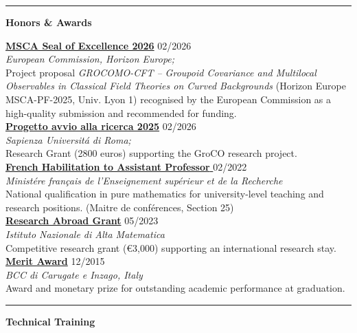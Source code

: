\documentclass[a4paper]{article}
\newcommand{\block}[1]{\hrule \vspace{0.2cm} \textbf{\Large #1} \vspace{0.2cm}}
\newcommand{\voice}[5]{\href{#4}{\textbf{#1}} \hfill #2 \\ \textit{#3} \\ {\small #5} \vspace{0.2cm} \\}
\begin{document}
\clearpage

\block{Honors \& Awards}

\voice{MSCA Seal of Excellence 2026}
        {02/2026}
        {European Commission, Horizon Europe;}
        {https://www.dropbox.com/scl/fi/zr05hlqz8rpq4d9j51b7q/2602-MSCA-SealofExcellence.pdf?rlkey=ovu5ad8hmdjh9nkaqy8rmq3lb&st=wbag5jwb&dl=0}       
        {Project proposal \emph{GROCOMO-CFT – Groupoid Covariance and Multilocal Observables in Classical Field Theories on Curved Backgrounds} (Horizon Europe MSCA-PF-2025, Univ. Lyon 1) recognised by the European Commission as a high-quality submission and recommended for funding.}
\voice{Progetto avvio alla ricerca 2025}
        {02/2026}
        {Sapienza Universit\'a di Roma;}
        {https://www.dropbox.com/scl/fi/sgragjrgzdtfesdmhm4bv/2602-AvvioRicerca-Grant.pdf?rlkey=6iplpssiva66zkdw7qna4wl0c&st=x8jty2x7&dl=0}       
        {Research Grant (2800 euros) supporting the GroCO research project.}
\voice{French Habilitation to Assistant Professor }
  {02/2022}
  {Minist\'ere français de l'Enseignement sup\'erieur et de la Recherche}
  {https://www.galaxie.enseignementsup-recherche.gouv.fr/ensup/qualification/Resultats_2022/qualifies_MCF_2022.pdf}
  {National qualification in pure mathematics for university-level teaching and research positions. (Maitre de conf\'erences, Section 25)}
\voice{Research Abroad Grant}
  {05/2023}
  {Istituto Nazionale di Alta Matematica}
  {https://www.altamatematica.it/wp-content/uploads/2022/12/bando-estero-2022-2023-1.pdf}
  {Competitive research grant (€3,000) supporting an international research stay.}
\voice{Merit Award}
  {12/2015}
  {BCC di Carugate e Inzago, Italy}
  {https://web.archive.org/web/20191207203437/https://www.bccmilano.it/news/dettaglio_news_div.asp?i_menuID=54872&hNewsID=132411}
  {Award and monetary prize for outstanding academic performance at graduation.}


    \block{Technical Training}
   
\end{document}

